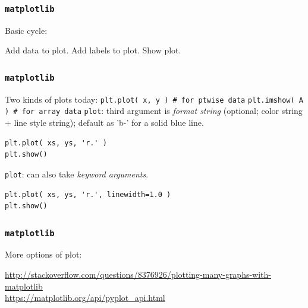 \documentclass[11pt]{beamer}
\begin{document}
\begin{frame}[fragile]
  \frametitle{\texttt{matplotlib}}
  \Enlarge

  \begin{enumerate}
  \myitem  Basic cycle:
    \begin{enumerate}
    \mysubitem  Add data to plot.
    \mysubitem  Add labels to plot.
    \mysubitem  Show plot.
    \end{enumerate}
  \end{enumerate}
\end{frame}

\begin{frame}[fragile]
  \frametitle{\texttt{matplotlib}}
  \Enlarge

  \begin{enumerate}
    \myitem  Two kinds of plots today:
    \mysubitem  \texttt{plt.plot( x, y )  \# for ptwise data}
    \mysubitem  \texttt{plt.imshow( A )   \# for array data}
    \myitem  \texttt{plot}:  third argument is \emph{format string} (optional; color string + line style string); default as  'b-' for a solid blue line. 
  \end{enumerate}
  \begin{Verbatim}
plt.plot( xs, ys, 'r.' )
plt.show()
  \end{Verbatim}
  \begin{enumerate}
    \myitem  \texttt{plot}:  can also take \emph{keyword arguments}.
  \end{enumerate}
  \begin{Verbatim}
plt.plot( xs, ys, 'r.', linewidth=1.0 )
plt.show()
  \end{Verbatim}
\end{frame}

\begin{frame}[fragile]
  \frametitle{\texttt{matplotlib}}
  \Enlarge

More options of plot: 

\url{http://stackoverflow.com/questions/8376926/plotting-many-graphs-with-matplotlib}\\

\vspace{2mm}
\url{https://matplotlib.org/api/pyplot_api.html}

\end{frame}
\end{document}

